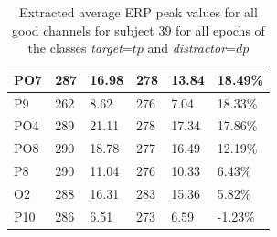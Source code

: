 \documentclass[a4paper]{article}
\begin{document}
\begin{table}[]
\begin{tabular}{|l|l|l|l|l|l|}
PO7              & 287                         & 16.98                        & 278                             & 13.84                            & 18.49\%                        \\ \hline
P9               & 262                         & 8.62                         & 276                             & 7.04                             & 18.33\%                        \\ \hline
PO4              & 289                         & 21.11                        & 278                             & 17.34                            & 17.86\%                        \\ \hline
PO8              & 290                         & 18.78                        & 277                             & 16.49                            & 12.19\%                        \\ \hline
P8               & 290                         & 11.04                        & 276                             & 10.33                            & 6.43\%                         \\ \hline
O2               & 288                         & 16.31                        & 283                             & 15.36                            & 5.82\%                         \\ \hline
P10              & 286                         & 6.51                         & 273                             & 6.59                             & -1.23\%                        \\ \hline
\end{tabular}
\label{tab:erpPeaks39}
\caption{Extracted average ERP peak values for all good channels for subject 39 for all epochs of the classes \textit{target}=$tp$ and \textit{distractor}=$dp$}
\end{table}
\end{document}
